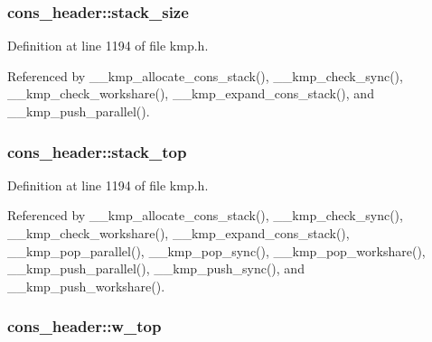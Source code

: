 \hypertarget{structcons__header_a1ecba36b94cb90347492ca2077dbea33}{
\subsubsection[{stack\-\_\-size}]{ cons\-\_\-header\-::stack\-\_\-size}}\label{structcons__header_a1ecba36b94cb90347492ca2077dbea33}


Definition at line 1194 of file kmp.\-h.



Referenced by \-\_\-\-\_\-kmp\-\_\-allocate\-\_\-cons\-\_\-stack(), \-\_\-\-\_\-kmp\-\_\-check\-\_\-sync(), \-\_\-\-\_\-kmp\-\_\-check\-\_\-workshare(), \-\_\-\-\_\-kmp\-\_\-expand\-\_\-cons\-\_\-stack(), and \-\_\-\-\_\-kmp\-\_\-push\-\_\-parallel().

\hypertarget{structcons__header_a264d80e923a0a4babc16d0ab3672ca31}{
\subsubsection[{stack\-\_\-top}]{ cons\-\_\-header\-::stack\-\_\-top}}\label{structcons__header_a264d80e923a0a4babc16d0ab3672ca31}


Definition at line 1194 of file kmp.\-h.



Referenced by \-\_\-\-\_\-kmp\-\_\-allocate\-\_\-cons\-\_\-stack(), \-\_\-\-\_\-kmp\-\_\-check\-\_\-sync(), \-\_\-\-\_\-kmp\-\_\-check\-\_\-workshare(), \-\_\-\-\_\-kmp\-\_\-expand\-\_\-cons\-\_\-stack(), \-\_\-\-\_\-kmp\-\_\-pop\-\_\-parallel(), \-\_\-\-\_\-kmp\-\_\-pop\-\_\-sync(), \-\_\-\-\_\-kmp\-\_\-pop\-\_\-workshare(), \-\_\-\-\_\-kmp\-\_\-push\-\_\-parallel(), \-\_\-\-\_\-kmp\-\_\-push\-\_\-sync(), and \-\_\-\-\_\-kmp\-\_\-push\-\_\-workshare().

\hypertarget{structcons__header_ac4dd32db9b0ccf46f318bb61260a8d67}{
\subsubsection[{w\-\_\-top}]{ cons\-\_\-header\-::w\-\_\-top}}\label{structcons__header_ac4dd32db9b0ccf46f318bb61260a8d67}



